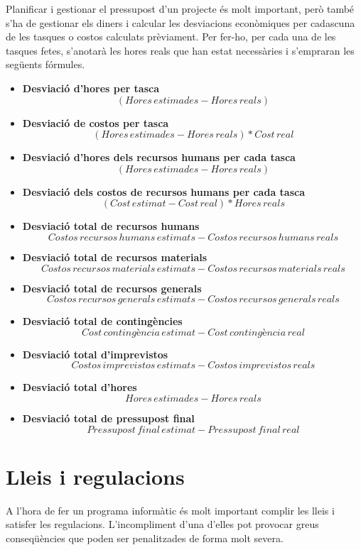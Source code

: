 \documentclass[a4paper]{article}
\begin{document}
Planificar i gestionar el pressupost d'un projecte és molt important, però també s'ha de gestionar els diners i calcular les desviacions econòmiques per cadascuna de les tasques o costos calculats prèviament. Per fer-ho, per cada una de les tasques fetes, s'anotarà les hores reals que han estat necessàries i s'empraran les següents fórmules.
\begin{itemize}
    \item \textbf{Desviació d'hores per tasca}
    \[(Hores\,estimades - Hores\,reals)\]
    \item \textbf{Desviació de costos per tasca}
    \[(Hores\,estimades - Hores\,reals) * Cost\,real\]
    \item \textbf{Desviació d'hores dels recursos humans per cada tasca}
    \[(Hores\,estimades - Hores\,reals)\]
    \item \textbf{Desviació dels costos de recursos humans per cada tasca}
    \[(Cost\, estimat - Cost\,real) * Hores\,reals\]
    \item \textbf{Desviació total de recursos humans}
    \[Costos\,recursos\,humans\,estimats - Costos\,recursos\,humans\,reals\]
    \item \textbf{Desviació total de recursos materials}
    \[Costos\,recursos\,materials\,estimats - Costos\,recursos\,materials\,reals\]
    \item \textbf{Desviació total de recursos generals}
    \[Costos\,recursos\,generals\,estimats - Costos\,recursos\,generals\,reals\]
    \item \textbf{Desviació total de contingències}
    \[Cost\,contingència\,estimat - Cost\,contingència\,real\]
    \item \textbf{Desviació total d'imprevistos}
    \[Costos\,imprevistos\,estimats - Costos\,imprevistos\,reals\]
    \item \textbf{Desviació total d'hores}
    \[Hores\,estimades - Hores\,reals\]
    \item \textbf{Desviació total de pressupost final}
    \[Pressupost\,final\,estimat - Pressupost\,final\,real\]
\end{itemize}

\newpage
\section{Lleis i regulacions}
A l'hora de fer un programa informàtic és molt important complir les lleis i satisfer les regulacions. L'incompliment d'una d'elles pot provocar greus conseqüències que poden ser penalitzades de forma molt severa. 
\end{document}
